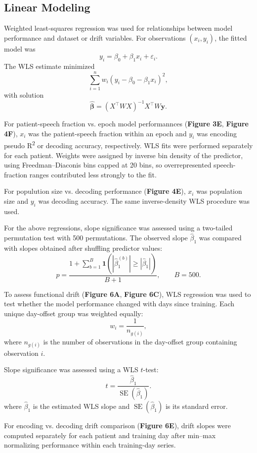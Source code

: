 \documentclass[pdflatex,sn-basic]{sn-jnl}%
\theoremstyle{thmstyleone}%
\theoremstyle{thmstyletwo}%
\theoremstyle{thmstylethree}%
\begin{document}
\subsection{Linear Modeling}\label{subsec18}

Weighted least-squares regression was used for relationships between model performance and dataset or drift variables. For observations $(x_i, y_i)$, the fitted model was
\[
y_i = \beta_0 + \beta_1 x_i + \varepsilon_i.
\]
The WLS estimate minimized
\[
\sum_{i=1}^{n} w_i
\left(y_i - \beta_0 - \beta_1 x_i\right)^2,
\]
with solution
\[
\hat{\boldsymbol{\beta}}
=
(X^\top W X)^{-1}X^\top W\mathbf{y}.
\]

For patient-speech fraction vs. epoch model performannces (\textbf{Figure 3E}, \textbf{Figure 4F}), $x_i$ was the patient-speech fraction within an epoch and $y_i$ was encoding pseudo R\textsuperscript{{2}} or decoding accuracy, respectively. WLS fits were performed separately for each patient. Weights were assigned by inverse bin density of the predictor, using Freedman--Diaconis bins capped at 20 bins, so overrepresented speech-fraction ranges contributed less strongly to the fit.

For populution size vs. decoding performance (\textbf{Figure 4E}), $x_i$ was population size and $y_i$ was decoding accuracy. The same inverse-density WLS procedure was used.

For the above regressions, slope significance was assessed using a two-tailed permutation test with 500 permutations. The observed slope $\hat{\beta}_1$ was compared with slopes obtained after shuffling predictor values:
\[
p =
\frac{
1 + \sum_{b=1}^{B}
\mathbf{1}
\left(
|\hat{\beta}_{1}^{(b)}| \geq |\hat{\beta}_{1}|
\right)
}
{B + 1},
\qquad B = 500.
\]

To assess functional drift (\textbf{Figure 6A}, \textbf{Figure 6C}), WLS regression was used to test whether the model performance changed with days since training. Each unique day-offset group was weighted equally:
\[
w_i = \frac{1}{n_{g(i)}},
\]
where $n_{g(i)}$ is the number of observations in the day-offset group containing observation $i$.

Slope significance was assessed using a WLS $t$-test:
\[
t =
\frac{\hat{\beta}_1}{\operatorname{SE}(\hat{\beta}_1)}.
\]
where \(\hat{\beta}_1\) is the estimated WLS slope and
\(\operatorname{SE}(\hat{\beta}_1)\) is its standard error.

For encoding vs. decoding drift comparison (\textbf{Figure 6E}), drift slopes were computed separately for each patient and training day after min--max normalizing performance within each training-day series.
\end{document}
